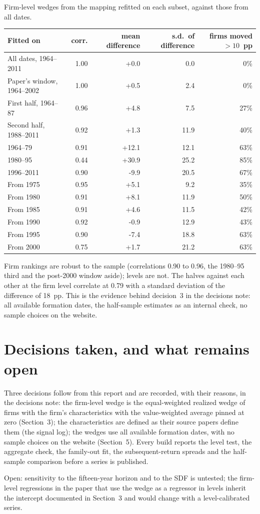 \documentclass[11pt]{article}
\begin{document}
\begin{tbl}{Firm-level wedges from the mapping refitted on each subset, against those from all dates.}
\begin{tabular}{lrrrr}\toprule
Fitted on & corr. & mean difference & s.d.\ of difference & firms moved $>10$~pp\\\midrule
All dates, 1964--2011 & 1.00 & +0.0 & 0.0 & 0\%\\
Paper's window, 1964--2002 & 1.00 & +0.5 & 2.4 & 0\%\\
First half, 1964--87 & 0.96 & +4.8 & 7.5 & 27\%\\
Second half, 1988--2011 & 0.92 & +1.3 & 11.9 & 40\%\\
1964--79 & 0.91 & +12.1 & 12.1 & 63\%\\
1980--95 & 0.44 & +30.9 & 25.2 & 85\%\\
1996--2011 & 0.90 & -9.9 & 20.5 & 67\%\\
From 1975 & 0.95 & +5.1 & 9.2 & 35\%\\
From 1980 & 0.91 & +8.1 & 11.9 & 50\%\\
From 1985 & 0.91 & +4.6 & 11.5 & 42\%\\
From 1990 & 0.92 & -0.9 & 12.9 & 43\%\\
From 1995 & 0.90 & -7.4 & 18.8 & 63\%\\
From 2000 & 0.75 & +1.7 & 21.2 & 63\%\\
\bottomrule
\end{tabular}
\end{tbl}

Firm rankings are robust to the sample (correlations 0.90 to 0.96, the
1980--95 third and the post-2000 window aside); levels are not. The halves
against each other at the firm level correlate at 0.79 with a
standard deviation of the difference of 18~pp. This is the evidence
behind decision~3 in the decisions note: all available formation dates,
the half-sample estimates as an internal check, no sample choices on the
website.


\section{Decisions taken, and what remains open}

Three decisions follow from this report and are recorded, with their
reasons, in the decisions note: the firm-level wedge is the equal-weighted
realized wedge of firms with the firm's characteristics with the
value-weighted average pinned at zero (Section~3); the characteristics are
defined as their source papers define them (the signal log); the
wedges use all available formation dates, with no sample choices on the
website (Section~5). Every build reports the level test, the aggregate
check, the family-out fit, the subsequent-return spreads and the
half-sample comparison before a series is published.

Open: sensitivity to the fifteen-year horizon and to the SDF is untested; the
firm-level regressions in the paper that use the wedge as a regressor in
levels inherit the intercept documented in Section~3 and would change with a
level-calibrated series.
\end{document}
